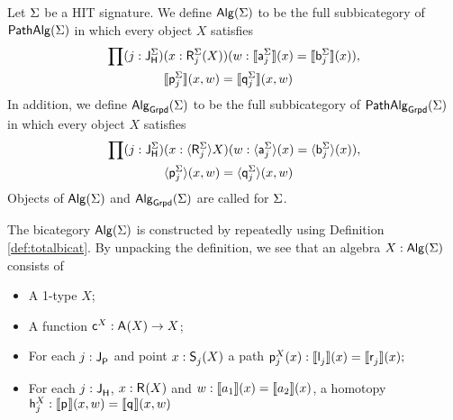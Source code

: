 \begin{definition}
\label{def:bicat_grpd}
Let $\sign$ be a HIT signature.
We define $\algM(\sign)$ to be the full subbicategory of $\pathalgM(\sign)$
in which every object $X$ satisfies
\begin{equation*}
\begin{split}
\prod
(j : \homotlabel[\sign]) &(x : \polyAct{\homotpointarg[\sign]_j}{X}) (w : \semE{\pathargleft[\sign]_j}(x) = \semE{\pathargright[\sign]_j}(x)),\\
&\semH{\homotleft[\sign]_j}(x, w) = \semH{\homotright[\sign]_j}(x, w)
\end{split}
\end{equation*}
In addition, we define $\algG{\sign}$ to be the full subbicategory of $\pathalgG{\sign} $
in which every object $X$ satisfies
\begin{equation*}
\begin{split}
\prod
(j : \homotlabel[\sign]) &(x : \semPG{\homotpointarg[\sign]_j}{X}) (w : \semEG{\pathargleft[\sign]_j}(x) = \semEG{\pathargright[\sign]_j}(x)),\\
&\semHG{\homotleft[\sign]_j}(x, w) = \semHG{\homotright[\sign]_j}(x, w)
\end{split}
\end{equation*}
Objects of $\algM(\sign)$ and $\algG{\sign}$ are called  for $\sign$.
\end{definition}

The bicategory $\algM(\sign)$ is constructed by repeatedly using Definition \ref{def:totalbicat}.
By unpacking the definition, we see that an algebra $X : \algM(\sign)$ consists of
\begin{itemize}
	\item A 1-type $X$;
	\item A function $\AlgPoint{X} : \polyAct{\pointconstr}{X} \rightarrow X$;
	\item For each $j : \pathlabel$ and point $x : \polyAct{\patharg_j}{X}$ a path
	$
	\AlgPath{X}{j}(x) : \semE{\pathleft_j}(x) = \semE{\pathright_j}(x);
	$
	\item For each $j : \homotlabel$, $x : \polyAct{\homotpointarg}{X}$ and $w : \semE{a_1}(x) = \semE{a_2}(x)$, a homotopy
	$
	\AlgHomot{X}{j} : \semH{\homotleft}(x, w) = \semH{\homotright}(x, w)
	$
\end{itemize}
